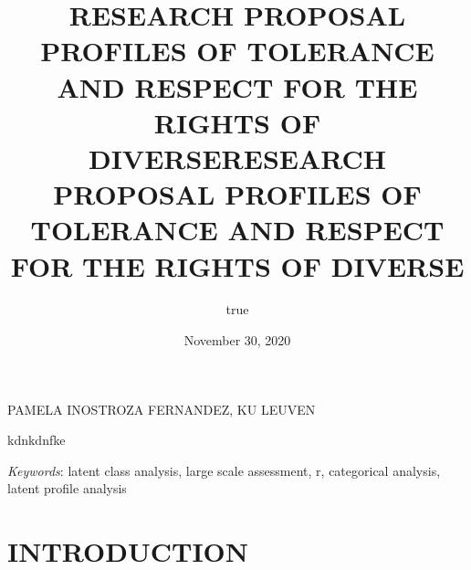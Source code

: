 \documentclass[
      11pt,
                      ]{article}
\title{RESEARCH PROPOSAL PROFILES OF
TOLERANCE AND RESPECT FOR THE RIGHTS OF DIVERSE}
\author{true}
\date{November 30, 2020}
\title{RESEARCH PROPOSAL PROFILES
OF TOLERANCE AND RESPECT FOR THE RIGHTS OF DIVERSE }
\date{}
\renewenvironment{abstract}
                  {{%
                    \setlength{\leftmargin}{0mm}
                    \setlength{\rightmargin}{\leftmargin}%
                  }%
                    \relax}
                  {\endlist}
\begin{document}



{%
\setlength{\parindent}{0pt}
\thispagestyle{plain}
{%
\maketitle  %

}




{
   \vskip 13.5pt\relax \normalsize\fontsize{11}{12} 
   \MakeUppercase{\textsf{\large Pamela Inostroza Fernandez}}, \small{KU
LEUVEN}   

}

}








\begin{abstract}


    \vskip 8.5pt %

\noindent \small{kdnkdnfke}


\vskip 8.5pt \noindent \emph{Keywords}: latent class analysis, large
scale assessment, r, categorical analysis, latent profile analysis \par




\end{abstract}


\vskip -8.5pt

{
\hypersetup{linkcolor=black}
\setcounter{tocdepth}{2}
\tableofcontents
}


{
\setcounter{tocdepth}{2}
\tableofcontents
}
\setlength{\parindent}{16pt}
\setlength{\parskip}{0pt}

\hypertarget{introduction}{%
\section{INTRODUCTION}\label{introduction}}
\end{document}

